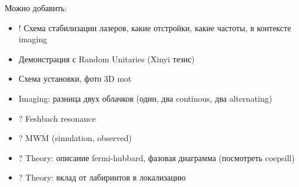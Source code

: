 Можно добавить:
\begin{itemize}
	\item ! Схема стабилизации лазеров, какие отстройки, какие частоты, в контексте imaging
	\item Демонстрация с Random Unitaries (Xinyi тезис)
	\item Схема установки, фото 3D mot
	\item Imaging: разница двух облачков (один, два continous, два alternating)
	\item ? Feshbach resonance
	\item ? MWM (simulation, observed)
	\item ? Theory: описание fermi-hubbard, фазовая диаграмма (посмотреть coepsill)
	\item ? Theory: вклад от лабиринтов в локализацию
\end{itemize}







